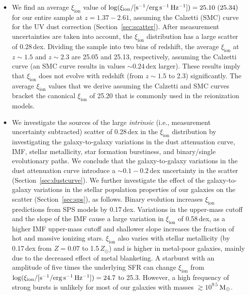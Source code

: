 \documentclass[iop]{emulateapj}
\newcommand{\xiion}{\ensuremath{\xi_{\mathrm{ion}}}}
\def\msun{${\rm M_\odot}$}
\begin{document}
\begin{itemize}

\item We find an average {\xiion} value of $\log(\xi_{\rm{ion}}/[{\rm{s^{-1}/erg\,s^{-1}\,Hz^{-1}}}])=25.10~(25.34)$ for our entire sample at $z=1.37-2.61$, assuming the Calzetti (SMC) curve for the UV dust correction (Section~\ref{sec:scatter}). After measurement uncertainties are taken into account, the {\xiion} distribution has a large scatter of 0.28\,dex. 
Dividing the sample into two bins of redshift, the average {\xiion} at $z\sim 1.5$ and $z\sim 2.3$ are 25.05 and 25.13, respectively, assuming the Calzetti curve (an SMC curve results in values $\sim 0.24$\,dex larger). These results imply that {\xiion} does not evolve with redshift (from $z\sim 1.5$ to 2.3) significantly.
The average {\xiion} values that we derive assuming the Calzetti and SMC curves bracket the canonical {\xiion} of 25.20  \citep{robertson13} that is commonly used in the reionization models.

\item We investigate the sources of the large {\em intrinsic} (i.e., measurement uncertainty subtracted) scatter of 0.28\,dex in the {\xiion} distribution by investigating the galaxy-to-galaxy variations in the dust attenuation curve, IMF, stellar metallicity, star formation burstiness, and binary/single evolutionary paths. We conclude that the galaxy-to-galaxy variations in the dust attenuation curve introduce a $\sim 0.1-0.2$\,dex uncertainty in the scatter (Section~\ref{sec:dustcurve}).
We further investigate the effect of the galaxy-to-galaxy variations in the stellar population properties of our galaxies on the scatter (Section~\ref{sec:sps}), as follows.
Binary evolution increases {\xiion} predictions from SPS models by 0.17\,dex.
%
Variations in the upper-mass cutoff and the slope of the IMF cause a large variation in {\xiion} of 0.58\,dex, as a higher IMF upper-mass cutoff and shallower slope increases the fraction of hot and massive ionizing stars.
%
{\xiion} also varies with stellar metallicity (by 0.17\,dex from $Z=0.07$ to 1.5\,$Z_{\odot}$) and is higher in metal-poor galaxies, mainly due to the decreased effect of metal blanketing. 
%
A starburst with an amplitude of five times the underlying SFR can change {\xiion} from $\log(\xi_{\rm{ion}}/[{\rm{s^{-1}/erg\,s^{-1}\,Hz^{-1}}}])=24.7$ to 25.3. However, a high frequency of strong bursts is unlikely for most of our galaxies with masses $\gtrsim 10^{9.5}$\,\msun.


\end{itemize}
\end{document}
